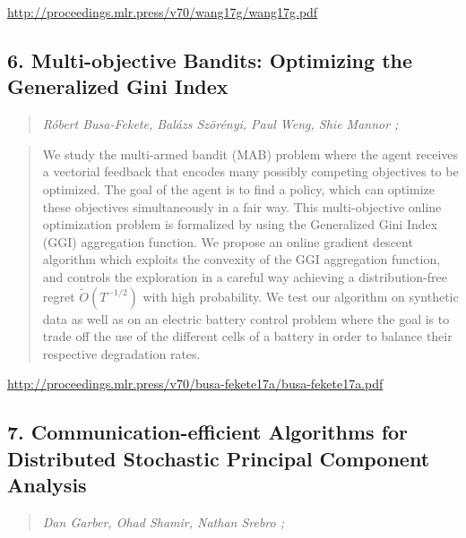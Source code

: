 \documentclass{article}
\begin{document}
\href{http://proceedings.mlr.press/v70/wang17g/wang17g.pdf}{http://proceedings.mlr.press/v70/wang17g/wang17g.pdf}

\subsection{6. Multi-objective Bandits: Optimizing the Generalized Gini Index}

\begin{quote}
\footnotesize{\textit{Róbert Busa-Fekete, Balázs Szörényi, Paul Weng, Shie Mannor ;}}
\end{quote}

\begin{quote}
    We study the multi-armed bandit (MAB) problem where the agent receives a vectorial feedback that encodes many possibly competing objectives to be optimized. The goal of the agent is to find a policy, which can optimize these objectives simultaneously in a fair way. This multi-objective online optimization problem is formalized by using the Generalized Gini Index (GGI) aggregation function. We propose an online gradient descent algorithm which exploits the convexity of the GGI aggregation function, and controls the exploration in a careful way achieving a distribution-free regret $\tilde{O}(T^{-1/2} )$ with high probability. We test our algorithm on synthetic data as well as on an electric battery control problem where the goal is to trade off the use of the different cells of a battery in order to balance their respective degradation rates.  \end{quote}

\href{http://proceedings.mlr.press/v70/busa-fekete17a/busa-fekete17a.pdf}{http://proceedings.mlr.press/v70/busa-fekete17a/busa-fekete17a.pdf}

\subsection{7. Communication-efficient Algorithms for Distributed Stochastic Principal Component Analysis}

\begin{quote}
\footnotesize{\textit{Dan Garber, Ohad Shamir, Nathan Srebro ;}}
\end{quote}
\end{document}
